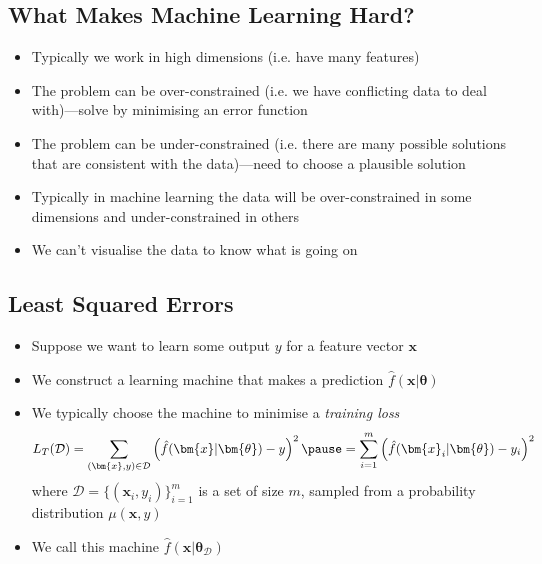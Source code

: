 
\begin{slide}
\section{What Makes Machine Learning Hard?}

\begin{PauseHighLight}
  \begin{itemize}
  \item Typically we work in high dimensions (i.e. have many
    features)\pause
  \item The problem can be over-constrained (i.e. we have conflicting
    data to deal with)\pause---solve by minimising an error function\pauseb
  \item The problem can be under-constrained (i.e. there are many
    possible solutions that are consistent with the data)\pause---need to
    choose a plausible solution\pauseb
  \item Typically in machine learning the data will be over-constrained
    in some dimensions and under-constrained in others\pause
  \item We can't visualise the data to know what is going
    on\pause
  \end{itemize}
\end{PauseHighLight}

\end{slide}


\begin{slide}
\section{Least Squared Errors}

\begin{PauseHighLight}
  \begin{itemize}
  \item Suppose we want to learn some output $y$ for a feature vector $\bm{x}$\pause
  \item We construct a learning machine that makes a prediction
    $\hat{f}(\bm{x}|\bm{\theta})$\pause
  \item We typically choose the machine to  minimise a \textit{training loss}
    \begin{align*}
      L_T(\mathcal{D}) = \sum_{(\bm{x},y)\in\mathcal{D}} \left(
      \hat{f}(\bm{x}|\bm{\theta}) - y \right)^2 \pause
      = \sum_{i=1}^m \left(
      \hat{f}(\bm{x}_i|\bm{\theta}) - y_i \right)^2
    \end{align*}
    where $\mathcal{D} = \{(\bm{x}_i, y_i)\}_{i=1}^m$ is a set of
    size $m$, sampled from a probability distribution $\mu(\bm{x},y)$\pauseb
  \item We call this machine $\hat{f}(\bm{x}\vert \bm{\theta}_\mathcal{D})$\pauseb
  \end{itemize}
\end{PauseHighLight}

\end{slide}


